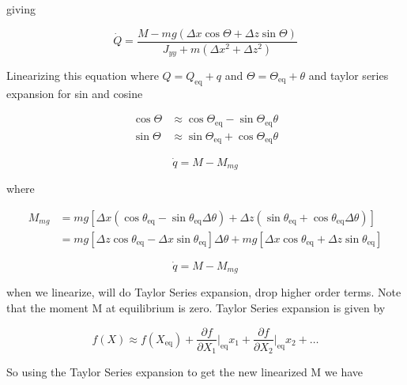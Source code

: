 giving

\begin{equation*}
  \dot{Q}=\frac{M-mg(\Delta x\cos\Theta+\Delta z\sin\Theta)}{J_{yy}+m(\Delta x^{2}+\Delta z^{2})}
\end{equation*}

Linearizing this equation where $Q=Q_{\text{eq}}+q$ and $\Theta=\Theta_{\text{eq}}+\theta$ and taylor series expansion for sin and cosine

\begin{equation*}
  \begin{split}
    \cos\Theta&\approx\cos\Theta_{\text{eq}}-\sin\Theta_{\text{eq}}\theta \\
    \sin\Theta&\approx\sin\Theta_{\text{eq}}+\cos\Theta_{\text{eq}}\theta
  \end{split}
\end{equation*}

\begin{equation*}
  [J_{yy}+m(\Delta x^{2}+\Delta z^{2})]\dot{q}=M-M_{mg}
\end{equation*}

where

\begin{equation*}
  \begin{split}
    M_{mg}&=mg[\Delta x(\cos\theta_{\text{eq}}-\sin\theta_{\text{eq}}\Delta\theta)+\Delta z(\sin\theta_{\text{eq}}+\cos\theta_{\text{eq}}\Delta\theta)] \\
    &=mg[\Delta z\cos\theta_{\text{eq}}-\Delta x\sin\theta_{\text{eq}}]\Delta\theta+mg[\Delta x\cos\theta_{\text{eq}}+\Delta z\sin\theta_{\text{eq}}]
  \end{split}
\end{equation*}

\begin{equation*}
  [J_{yy}+m(\Delta x^{2}+\Delta z^{2})]\dot{q}=M-M_{mg}
\end{equation*}

when we linearize, will do Taylor Series expansion, drop higher order terms.
Note that the moment M at equilibrium is zero.
Taylor Series expansion is given by

\begin{equation*}
  f(X)\approx f(X_{\text{eq}})+\frac{\partial{}f}{\partial{}X_{1}}\biggr|_{\text{eq}}x_{1}+\frac{\partial{}f}{\partial{}X_{2}}\biggr|_{\text{eq}}x_{2}+\dots
\end{equation*}

So using the Taylor Series expansion to get the new linearized M we have

